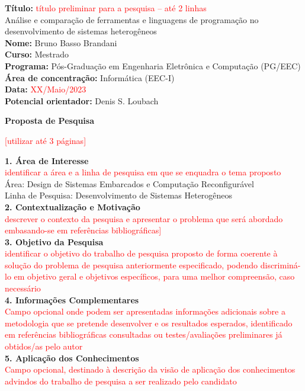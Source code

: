 \noindent
\textbf{Título:} \textcolor{red}{título preliminar para a pesquisa – até 2 linhas} \\
Análise e comparação de ferramentas e linguagens de programação no desenvolvimento de sistemas heterogêneos\\
\textbf{Nome:} Bruno Basso Brandani \\
\textbf{Curso:} Mestrado \\
\textbf{Programa:} Pós-Graduação em Engenharia Eletrônica e Computação (PG/EEC) \\
\textbf{Área de concentração:} Informática (EEC-I) \\
\textbf{Data:} \textcolor{red}{XX/Maio/2023} \\
\textbf{Potencial orientador:} Denis S. Loubach \\

\centerline{\textbf{Proposta de Pesquisa}}
\centerline{\textcolor{red}{[utilizar até 3 páginas] }}

\noindent
\textbf{1. Área de Interesse}\\
\noindent
\textcolor{red}{identificar a área e a linha de pesquisa em que se enquadra o tema proposto}
\\
Área: Design de Sistemas Embarcados e Computação Reconfigurável\\
Linha de Pesquisa: Desenvolvimento de Sistemas Heterogêneos\\

\noindent
\textbf{2. Contextualização e Motivação}\\
\noindent
\textcolor{red}{descrever o contexto da pesquisa e apresentar o problema que será abordado embasando-se em referências bibliográficas]}
\\

\noindent
\textbf{3. Objetivo da Pesquisa}\\
\noindent
\textcolor{red}{identificar o objetivo do trabalho de pesquisa proposto de forma coerente à solução do problema de pesquisa anteriormente especificado, podendo discriminá-lo em objetivo geral e objetivos específicos, para uma melhor compreensão, caso necessário}
\\

\noindent
\textbf{4. Informações Complementares}\\
\noindent
\textcolor{red}{Campo opcional onde podem ser apresentadas informações adicionais sobre a metodologia que se pretende desenvolver e os resultados esperados, identificado em referências bibliográficas consultadas ou testes/avaliações preliminares já obtidos/as pelo autor} 
\\

\noindent
\textbf{5. Aplicação dos Conhecimentos}\\
\noindent
\textcolor{red}{Campo opcional, destinado à descrição da visão de aplicação dos conhecimentos advindos do trabalho de pesquisa a ser realizado pelo candidato}
\\
